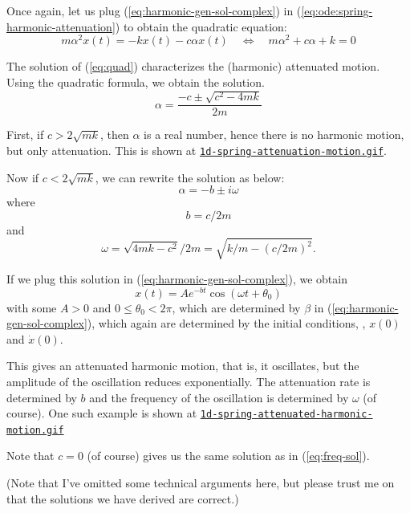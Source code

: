 \documentclass{article}
\begin{document}
Once again,
let us plug (\ref{eq:harmonic-gen-sol-complex}) in (\ref{eq:ode:spring-harmonic-attenuation})
to obtain
the quadratic equation:
\begin{equation}
\label{eq:quad}
m \alpha^2 x(t) = -k x(t) - c \alpha x(t)
\quad
\Leftrightarrow
\quad
m \alpha^2 + c \alpha + k = 0
\end{equation}

The solution of (\ref{eq:quad}) characterizes the (harmonic) attenuated motion. Using the quadratic formula,
we obtain the solution.
\[
\alpha = \frac
{-c \pm \sqrt{c^2 - 4mk}}
{2m}
\]

First, if $c > 2\sqrt{mk}$, then $\alpha$ is a real number,
hence there is no harmonic motion, but only attenuation. This is shown at
{\tt \href{https://github.com/sungheeyun/science/blob/main/animations/1d-spring-attenuation-motion.gif}{1d-spring-attenuation-motion.gif}}.

Now if $c<2 \sqrt{mk}$, we can rewrite the solution as below:
\[
\alpha =
-b
\pm
i \omega
\]
where
\begin{equation}
\label{eq:attenuation-coefficient}
b= {c}/ {2m}
\end{equation}
and
\begin{equation}
\label{eq:angular-frequency}
\omega
= {\sqrt{4mk-c^2}}/ {2m}
= \sqrt{k/m - (c/2m)^2}.
\end{equation}

If we plug this solution in (\ref{eq:harmonic-gen-sol-complex}),
we obtain
\begin{equation}
\label{eq:sol-spring-with-friction}
	x(t) =  A e^{-bt} \cos(\omega t + \theta_0)
\end{equation}
with some $A>0$ and $0\leq \theta_0 < 2\pi$,
which are determined by $\beta$ in (\ref{eq:harmonic-gen-sol-complex}),
which again are determined by the initial conditions,
\ie,
$x(0)$ and $\dot{x}(0)$.

This gives an attenuated harmonic motion,
that is,
it oscillates, but the amplitude of the oscillation reduces exponentially.
The attenuation rate is determined by $b$
and the frequency of the oscillation is determined by $\omega$ (of course).
One such example is shown at
{\tt \href{https://github.com/sungheeyun/science/blob/main/animations/1d-spring-attenuated-harmonic-motion.gif}{1d-spring-attenuated-harmonic-motion.gif}}

Note that $c=0$ (of course) gives us the same solution as in (\ref{eq:freq-sol}).

(Note that I've omitted some technical arguments here, but please trust me on that
the solutions we have derived are correct.)
\end{document}
